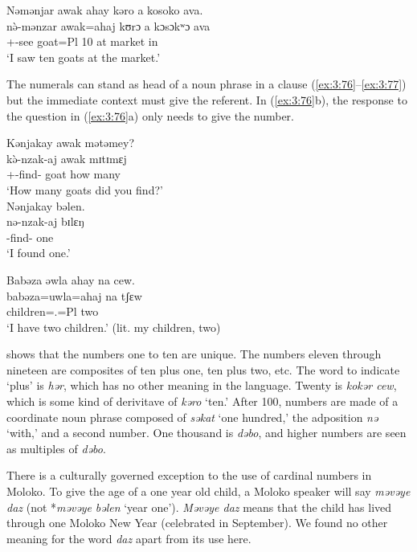 \ea \label{ex:3:75}
Nəmənjar  awak  ahay  kəro  a  kosoko  ava.\\
\gll  n\`{ə}-mənzar  awak=ahaj  kʊrɔ  a  kɔsɔkʷɔ  ava\\
      {\oneS}+{\PFV}-see  goat=Pl  10  at  market  in\\
\glt  ‘I saw ten goats at the market.’
\z

The numerals can stand as head of a noun phrase in a clause (\ref{ex:3:76}--\ref{ex:3:77}) but the immediate context must give the referent. In (\ref{ex:3:76}b), the response to the question in (\ref{ex:3:76}a) only needs to give the number. 

\ea\label{ex:3:76}
\ea
Kənjakay  awak  mətəmey?  \\
\gll  k\`{ə}-nzak-aj     awak   mɪtɪmɛj  \\
      {\twoS}+{\PFV}-find-{\CL}  goat  {how many}    \\
\glt  ‘How many goats did you find?’   \\
\ex
Nənjakay  bəlen.\\
\gll  nə-nzak-aj   bɪlɛŋ\\
      {\oneS}-find-{\CL}  one\\
\glt  ‘I found one.’
\z\z

\ea \label{ex:3:77}
Babəza  əwla  ahay  na  cew.\\
\gll  babəza=uwla=ahaj  na  tʃɛw\\
      children={\oneS}.{\POSS}=Pl  {\PSP}  two\\
\glt ‘I have two children.’ (lit. my children, two)
\z

 shows that the numbers one to ten are unique. The numbers eleven through nineteen are composites of ten plus one, ten plus two, etc. The word to indicate ‘plus’ is \textit{hər}, which has no other meaning in the language. Twenty is \textit{kokər cew}, which is some kind of derivitave of \textit{kəro}  ‘ten.’ After 100, numbers are made of a coordinate noun phrase composed of  \textit{səkat} ‘one hundred,’ the adposition \textit{nə} ‘with,’ and a second number. One thousand is \textit{dəbo}, and higher numbers are seen as multiples of \textit{dəbo}.

There is a culturally governed exception to the use of cardinal numbers in Moloko.  To give the age of a one year old child, a Moloko speaker will say \textit{məvəye daz} (not *\textit{məvəye} \textit{bəlen} ‘year one’). \textit{Məvəye daz} means that the child has lived through one Moloko New Year (celebrated in September). We found no other meaning for the word \textit{daz}  apart from its use here. 

